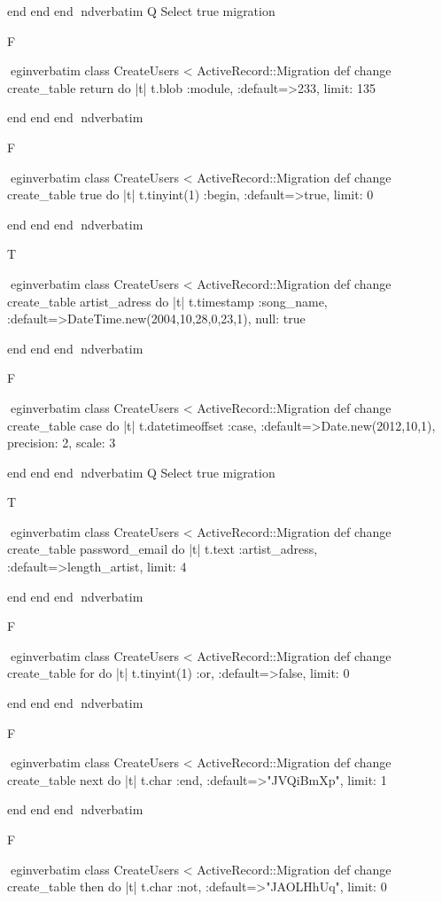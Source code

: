     end 
  end 
end
nd{verbatim}
Q
 Select true migration

F

egin{verbatim}
 class CreateUsers < ActiveRecord::Migration 
  def change 
    create_table return do |t| 
      t.blob :module, :default=>233, limit: 135
    
    end 
  end 
end
nd{verbatim}

F

egin{verbatim}
 class CreateUsers < ActiveRecord::Migration 
  def change 
    create_table true do |t| 
      t.tinyint(1) :begin, :default=>true, limit: 0
    
    end 
  end 
end
nd{verbatim}

T

egin{verbatim}
 class CreateUsers < ActiveRecord::Migration 
  def change 
    create_table artist_adress do |t| 
      t.timestamp :song_name, :default=>DateTime.new(2004,10,28,0,23,1), null: true
    
    end 
  end 
end
nd{verbatim}

F

egin{verbatim}
 class CreateUsers < ActiveRecord::Migration 
  def change 
    create_table case do |t| 
      t.datetimeoffset :case, :default=>Date.new(2012,10,1), precision: 2, scale: 3
    
    end 
  end 
end
nd{verbatim}
Q
 Select true migration

T

egin{verbatim}
 class CreateUsers < ActiveRecord::Migration 
  def change 
    create_table password_email do |t| 
      t.text :artist_adress, :default=>length_artist, limit: 4
    
    end 
  end 
end
nd{verbatim}

F

egin{verbatim}
 class CreateUsers < ActiveRecord::Migration 
  def change 
    create_table for do |t| 
      t.tinyint(1) :or, :default=>false, limit: 0
    
    end 
  end 
end
nd{verbatim}

F

egin{verbatim}
 class CreateUsers < ActiveRecord::Migration 
  def change 
    create_table next do |t| 
      t.char :end, :default=>"JVQiBmXp", limit: 1
    
    end 
  end 
end
nd{verbatim}

F

egin{verbatim}
 class CreateUsers < ActiveRecord::Migration 
  def change 
    create_table then do |t| 
      t.char :not, :default=>"JAOLHhUq", limit: 0
    
